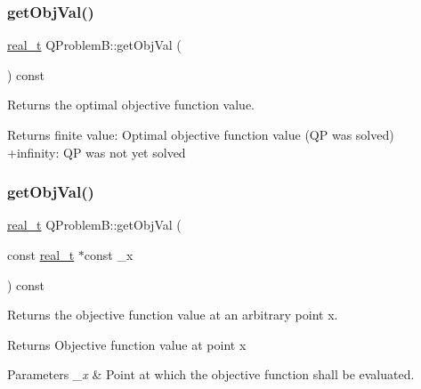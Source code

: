 \subsubsection{\texorpdfstring{get\+Obj\+Val()}{getObjVal()}\hspace{0.1cm}{\footnotesize\ttfamily [1/2]}}
{\footnotesize\ttfamily \hyperlink{qp_o_a_s_e_s__wrapper_8h_a0d00e2b3dfadee81331bbb39068570c4}{real\+\_\+t} Q\+Problem\+B\+::get\+Obj\+Val (\begin{DoxyParamCaption}{ }\end{DoxyParamCaption}) const}

Returns the optimal objective function value. \begin{DoxyReturn}{Returns}
finite value\+: Optimal objective function value (QP was solved) ~\newline
 +infinity\+: QP was not yet solved 
\end{DoxyReturn}
\mbox{\label{class_q_problem_b_ae84a514dbacfaa501db053a4c4c6093e}} 
\subsubsection{\texorpdfstring{get\+Obj\+Val()}{getObjVal()}\hspace{0.1cm}{\footnotesize\ttfamily [2/2]}}
{\footnotesize\ttfamily \hyperlink{qp_o_a_s_e_s__wrapper_8h_a0d00e2b3dfadee81331bbb39068570c4}{real\+\_\+t} Q\+Problem\+B\+::get\+Obj\+Val (\begin{DoxyParamCaption}\item[{const \hyperlink{qp_o_a_s_e_s__wrapper_8h_a0d00e2b3dfadee81331bbb39068570c4}{real\+\_\+t} $\ast$const}]{\+\_\+x }\end{DoxyParamCaption}) const}

Returns the objective function value at an arbitrary point x. \begin{DoxyReturn}{Returns}
Objective function value at point x 
\end{DoxyReturn}

\begin{DoxyParams}{Parameters}
{\em \+\_\+x} & Point at which the objective function shall be evaluated. \\
\hline
\end{DoxyParams}
\mbox{\label{class_q_problem_b_aa8f201dd83574ca6d9c8aa7a7b6a8f4f}} 
